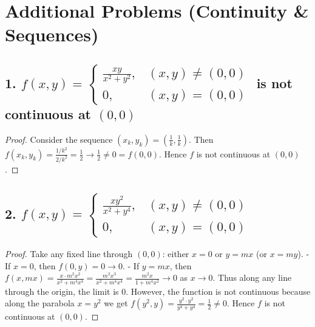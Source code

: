 \documentclass{article}
\begin{document}
\section*{Additional Problems (Continuity \& Sequences)}

\subsection*{1. $f(x,y)=\begin{cases}\frac{xy}{x^2+y^2},&(x,y)\neq(0,0)\\0,&(x,y)=(0,0)\end{cases}$ is not continuous at $(0,0)$}
\begin{proof}
	Consider the sequence $(x_k,y_k)=(\frac1k,\frac1k)$. Then $f(x_k,y_k)=\frac{1/k^2}{2/k^2}=\frac12\to\frac12\neq0=f(0,0)$. Hence $f$ is not continuous at $(0,0)$.
\end{proof}

\subsection*{2. $f(x,y)=\begin{cases}\frac{xy^2}{x^2+y^4},&(x,y)\neq(0,0)\\0,&(x,y)=(0,0)\end{cases}$}
\begin{proof}
	Take any fixed line through $(0,0)$: either $x=0$ or $y=mx$ (or $x=my$).
	- If $x=0$, then $f(0,y)=0\to0$.
	- If $y=mx$, then $f(x,mx)=\frac{x\cdot m^2x^2}{x^2+m^4x^4}=\frac{m^2x^3}{x^2+m^4x^4}=\frac{m^2x}{1+m^4x^2}\to0$ as $x\to0$.
	Thus along any line through the origin, the limit is $0$. However, the function is not continuous because along the parabola $x=y^2$ we get $f(y^2,y)=\frac{y^2\cdot y^2}{y^4+y^4}=\frac12\neq0$. Hence $f$ is not continuous at $(0,0)$.
\end{proof}
\end{document}
